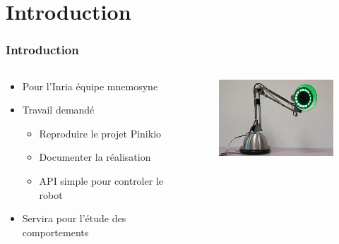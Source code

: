 \section*{Introduction}
\begin{frame}
  \frametitle{Introduction}
  \begin{columns}[c]
    \begin{column}[T]{.5\textwidth}
      \begin{itemize}
        \item Pour l'Inria équipe mnemosyne
        \item Travail demandé
          \begin{itemize}
            \item Reproduire le projet Pinikio
            \item Documenter la réalisation
            \item API simple pour controler le robot
          \end{itemize}
        \item Servira pour l'étude des comportements
      \end{itemize}
    \end{column}
    \begin{column}[T]{.5\textwidth}
      \begin{figure}
        \begin{center}
          \includegraphics[width=5cm]{../img/pinokio.JPG}
        \end{center}
      \end{figure}
    \end{column}
  \end{columns}   
\end{frame}
